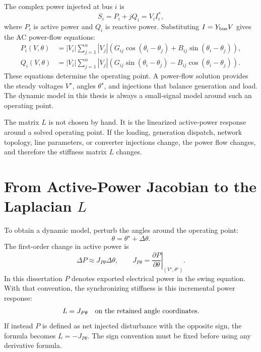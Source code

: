 The complex power injected at bus \(i\) is
\begin{equation}
  S_i=P_i+jQ_i=V_i I_i^*,
  \label{eq:guide_complex_power}
\end{equation}
where \(P_i\) is active power and \(Q_i\) is reactive power. Substituting
\(I=Y_{\rm bus}V\) gives the AC power-flow equations:
\begin{align}
  P_i(V,\theta)
  &=
  |V_i|\sum_{j=1}^n |V_j|
  \left(
  G_{ij}\cos(\theta_i-\theta_j)
  +
  B_{ij}\sin(\theta_i-\theta_j)
  \right),
  \label{eq:guide_active_power}\\
  Q_i(V,\theta)
  &=
  |V_i|\sum_{j=1}^n |V_j|
  \left(
  G_{ij}\sin(\theta_i-\theta_j)
  -
  B_{ij}\cos(\theta_i-\theta_j)
  \right).
  \label{eq:guide_reactive_power}
\end{align}
These equations determine the operating point. A power-flow solution provides
the steady voltages \(V^\star\), angles \(\theta^\star\), and injections that
balance generation and load. The dynamic model in this thesis is always a
small-signal model around such an operating point.

\begin{remark}
The matrix \(L\) is not chosen by hand. It is the linearized active-power
response around a solved operating point. If the loading, generation dispatch,
network topology, line parameters, or converter injections change, the power
flow changes, and therefore the stiffness matrix \(L\) changes.
\end{remark}

\section{From Active-Power Jacobian to the Laplacian \texorpdfstring{\(L\)}{L}}

To obtain a dynamic model, perturb the angles around the operating point:
\begin{equation}
  \theta=\theta^\star+\Delta\theta.
  \label{eq:guide_angle_perturbation}
\end{equation}
The first-order change in active power is
\begin{equation}
  \Delta P
  \approx
  J_{P\theta}\Delta\theta,
  \qquad
  J_{P\theta}
  =
  \left.
  \frac{\partial P}{\partial\theta}
  \right|_{(V^\star,\theta^\star)}.
  \label{eq:guide_active_jacobian}
\end{equation}
In this dissertation \(P\) denotes exported electrical power in the swing
equation. With that convention, the synchronizing stiffness is this incremental
power response:
\begin{equation}
  L=J_{P\theta}
  \quad
  \hbox{on the retained angle coordinates.}
  \label{eq:guide_L_from_jacobian}
\end{equation}
If instead \(P\) is defined as net injected disturbance with the opposite sign,
the formula becomes \(L=-J_{P\theta}\). The sign convention must be fixed before
using any derivative formula.

